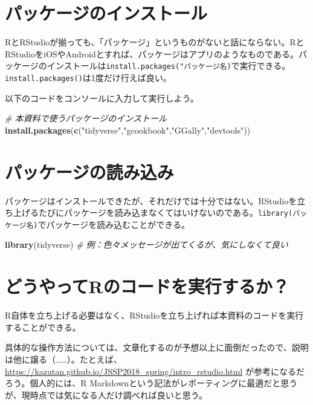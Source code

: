 \documentclass[]{book}
\newenvironment{Shaded}{\begin{snugshade}}{\end{snugshade}}
\newcommand{\KeywordTok}[1]{\textcolor[rgb]{0.13,0.29,0.53}{\textbf{#1}}}
\newcommand{\StringTok}[1]{\textcolor[rgb]{0.31,0.60,0.02}{#1}}
\newcommand{\CommentTok}[1]{\textcolor[rgb]{0.56,0.35,0.01}{\textit{#1}}}
\newcommand{\NormalTok}[1]{#1}
\begin{document}
\section{パッケージのインストール}

RとRStudioが揃っても、「パッケージ」というものがないと話にならない。RとRStudioをiOSやAndroidとすれば、パッケージはアプリのようなものである。パッケージのインストールは\texttt{install.packages("パッケージ名)}で実行できる。\texttt{install.packages()}は1度だけ行えば良い。

以下のコードをコンソールに入力して実行しよう。

\begin{Shaded}
\begin{Highlighting}[]
\CommentTok{# 本資料で使うパッケージのインストール}
\KeywordTok{install.packages}\NormalTok{(}\KeywordTok{c}\NormalTok{(}\StringTok{"tidyverse"}\NormalTok{,}\StringTok{"gcookbook"}\NormalTok{,}\StringTok{"GGally"}\NormalTok{,}\StringTok{"devtools"}\NormalTok{))}
\end{Highlighting}
\end{Shaded}

\section{パッケージの読み込み}

パッケージはインストールできたが、それだけでは十分ではない。RStudioを立ち上げるたびにパッケージを読み込まなくてはいけないのである。\texttt{library(パッケージ名)}でパッケージを読み込むことができる。

\begin{Shaded}
\begin{Highlighting}[]
\KeywordTok{library}\NormalTok{(tidyverse) }\CommentTok{# 例：色々メッセージが出てくるが、気にしなくて良い}
\end{Highlighting}
\end{Shaded}

\section{どうやってRのコードを実行するか？}\label{r}

R自体を立ち上げる必要はなく、RStudioを立ち上げれば本資料のコードを実行することができる。

具体的な操作方法については、文章化するのが予想以上に面倒だったので、説明は他に譲る（\ldots{}\ldots{}）。たとえば、\url{https://kazutan.github.io/JSSP2018_spring/intro_rstudio.html}
が参考になるだろう。個人的には、R
Markdownという記法がレポーティングに最適だと思うが、現時点では気になる人だけ調べれば良いと思う。
\end{document}

